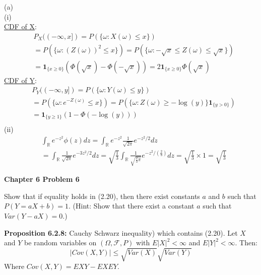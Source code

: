 \documentclass[12pt,letterpaper, onecolumn]{exam}
\newcommand{\real}{\mathbb{R}}
\newcommand{\calF}{\mathcal{F}}
\newcommand{\one}{\mathbf{1}}
\begin{document}
\begin{questions}
    \begin{solution}
        (a) \\
        (i) \\
        \underline{CDF of X}: 
        \begin{align*}
            & P_X((-\infty, x]) = P(\{\omega: X(\omega) \leq x\}) \\
            & = P(\{\omega: (Z(\omega))^2 \leq x \}) = P(\{\omega: -\sqrt{x} \leq Z(\omega) \leq \sqrt{x} \}) \\
            & = \one_{\{x \geq 0\}}(\Phi(\sqrt{x}) - \Phi(-\sqrt{x})) = 2\one_{\{x \geq 0\}}\Phi(\sqrt{x})
        \end{align*}
        \underline{CDF of Y}: 
        \begin{align*}
            & P_Y((-\infty, y]) = P(\{\omega: Y(\omega) \leq y\}) \\
            & = P(\{\omega: e^{-Z(\omega)} \leq x \}) = P(\{\omega:  Z(\omega) \geq -\log(y) \}\one_{\{y > 0\}}) \\
            & = \one_{\{y \geq 1\}}(1 - \Phi(-\log(y))) \\
        \end{align*}
        (ii) \begin{align*}
            & \int_{\real} e^{-z^2}\phi(z)dz = \int_{\real} e^{-z^2}\frac{1}{\sqrt{2\pi}}e^{-z^2/2}dz \\
            & = \int_{\real} \frac{1}{\sqrt{2\pi}}e^{-3z^2/2}dz = \sqrt{\frac{1}{3}}\int_{\real} \frac{1}{\sqrt{\frac{2}{3}\pi}}e^{-z^2/(\tfrac{2}{3})}dz = \sqrt{\frac{1}{3}} \times 1 = \sqrt{\frac{1}{3}}
        \end{align*}
    \end{solution}
\clearpage
    \question \textbf{Chapter 6 Problem 6}

    Show that if equality holds in (2.20), then there exist constants $a$ and $b$ such that $P (Y = aX + b)=1$. (Hint: Show that there exist a constant $a$ such that $Var(Y - aX)= 0$.)

    \textbf{Proposition 6.2.8:} Cauchy Schwarz inequality) which contains (2.20). Let $X$ and $Y$ be random variables on $(\Omega, \calF, P)$ with $E|X|^2 < \infty$ and $E|Y|^2 < \infty$. Then:
    \[|Cov(X, Y)| \leq \sqrt{Var(X)}\sqrt{Var(Y)}\]
    Where $Cov(X, Y) = EXY - EXEY$.

    \begin{solution}
        
    \end{solution}


\end{questions}
\end{document}
